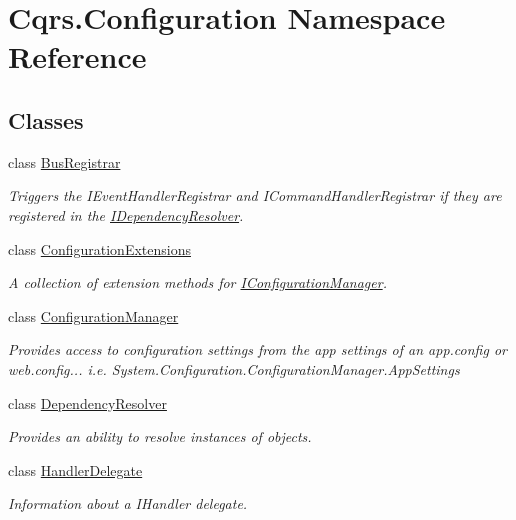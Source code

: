 \hypertarget{namespaceCqrs_1_1Configuration}{}\section{Cqrs.\+Configuration Namespace Reference}
\label{namespaceCqrs_1_1Configuration}
\subsection*{Classes}
\begin{DoxyCompactItemize}
\item 
class \hyperlink{classCqrs_1_1Configuration_1_1BusRegistrar}{Bus\+Registrar}
\begin{DoxyCompactList}\small\item\em Triggers the I\+Event\+Handler\+Registrar and I\+Command\+Handler\+Registrar if they are registered in the \hyperlink{interfaceCqrs_1_1Configuration_1_1IDependencyResolver}{I\+Dependency\+Resolver}. \end{DoxyCompactList}\item 
class \hyperlink{classCqrs_1_1Configuration_1_1ConfigurationExtensions}{Configuration\+Extensions}
\begin{DoxyCompactList}\small\item\em A collection of extension methods for \hyperlink{interfaceCqrs_1_1Configuration_1_1IConfigurationManager}{I\+Configuration\+Manager}. \end{DoxyCompactList}\item 
class \hyperlink{classCqrs_1_1Configuration_1_1ConfigurationManager}{Configuration\+Manager}
\begin{DoxyCompactList}\small\item\em Provides access to configuration settings from the app settings of an app.\+config or web.\+config... i.\+e. System.\+Configuration.\+Configuration\+Manager.\+App\+Settings \end{DoxyCompactList}\item 
class \hyperlink{classCqrs_1_1Configuration_1_1DependencyResolver}{Dependency\+Resolver}
\begin{DoxyCompactList}\small\item\em Provides an ability to resolve instances of objects. \end{DoxyCompactList}\item 
class \hyperlink{classCqrs_1_1Configuration_1_1HandlerDelegate}{Handler\+Delegate}
\begin{DoxyCompactList}\small\item\em Information about a I\+Handler delegate. \end{DoxyCompactList}\item 

\end{DoxyCompactItemize}
